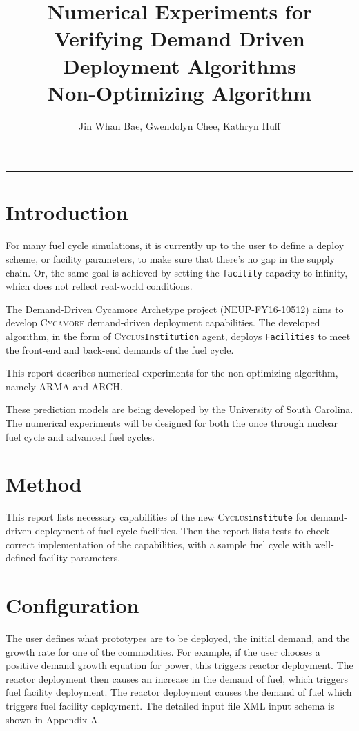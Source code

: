 \documentclass[11pt,letterpaper]{article}
\title{Numerical Experiments for Verifying Demand Driven Deployment Algorithms 
        \\ \vspace{0.5em} Non-Optimizing Algorithm}
\author{Jin Whan Bae, Gwendolyn Chee, Kathryn Huff}
\newcommand{\Cyclus}{\textsc{Cyclus}\xspace}%
\newcommand{\Cycamore}{\textsc{Cycamore}\xspace}%
\begin{document}
	\maketitle
	\hrule

\section{Introduction}
For many fuel cycle simulations, it is currently up to the user to define
a deploy scheme, or facility parameters, to make sure that there's no gap
in the supply chain. Or, the same goal is achieved by setting the
\texttt{facility} capacity to infinity, which does not reflect real-world
conditions. 

The Demand-Driven Cycamore Archetype project (NEUP-FY16-10512) aims to develop \Cycamore demand-driven deployment capabilities.
The developed algorithm, in the form of \Cyclus \texttt{Institution}
agent, deploys \texttt{Facilities} to meet the front-end and back-end demands of the 
fuel cycle.

This report describes numerical experiments for the non-optimizing algorithm, namely \gls{ARMA} and \gls{ARCH}.

These prediction models are being developed by the University of South Carolina. The numerical experiments will be designed for both
 the once through nuclear fuel 
cycle and advanced fuel cycles. 

\section{Method}
This report lists necessary capabilities of the new \Cyclus \texttt{institute}
for demand-driven deployment of fuel cycle facilities. 
Then the report lists tests to check correct implementation of the capabilities,
with a sample fuel cycle with well-defined facility parameters.


\section{Configuration}
The user defines what prototypes are to be deployed, the initial demand, and the 
growth rate for one of the commodities. For example, if the user
chooses a positive demand growth equation for power, this triggers reactor deployment.
The reactor deployment then causes an increase in the demand of fuel, which triggers fuel facility deployment.
The reactor deployment causes the demand of fuel
which triggers fuel facility deployment. The detailed input file XML input schema
is shown in Appendix A. 
\end{document}
